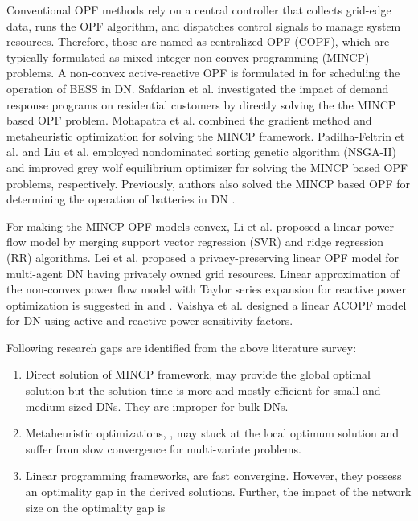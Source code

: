 \documentclass{article}
\begin{document}
Conventional OPF methods rely on a central controller that collects grid-edge data, runs the OPF algorithm, and dispatches control signals to manage system resources. Therefore, those are named as centralized OPF (COPF), which are typically formulated as mixed-integer non-convex programming (MINCP) problems. A non-convex active-reactive OPF is formulated in \cite{Gabash} for scheduling the operation of BESS in DN. Safdarian et al. \cite{Safdarian} investigated the impact of demand response programs on residential customers by directly solving the the MINCP based OPF problem. Mohapatra et al. \cite{Mohapatra} combined the gradient method and metaheuristic optimization for solving the MINCP framework. Padilha-Feltrin et al. \cite{Padilha-Feltrin} and Liu et al. \cite{Liu} employed nondominated sorting genetic algorithm (NSGA-II) and improved grey wolf equilibrium optimizer for solving the MINCP based OPF problems, respectively. Previously, authors also solved the MINCP based OPF for determining the operation of batteries in DN \cite{Jha}.   

For making the MINCP OPF models convex, Li et al. \cite{Li} proposed a linear power flow model by merging support vector regression (SVR) and ridge regression (RR) algorithms. Lei et al. \cite{Lei} proposed a privacy-preserving linear OPF model for multi-agent DN having privately owned grid resources.  Linear approximation of the non-convex power flow model with Taylor series expansion for reactive power optimization is suggested in \cite{spaul} and \cite{Yang}. Vaishya et al. \cite{Vaishya} designed a linear ACOPF model for DN using active and reactive power sensitivity factors.

Following research gaps are identified from the above literature survey:
\begin{enumerate}
    \item Direct solution of MINCP framework, \cite{Gabas, Safdarian, Jha} may provide the global optimal solution but the solution time is more and mostly efficient for small and medium sized DNs. They are improper for bulk DNs.
    \item Metaheuristic optimizations, \cite{Mohapatra, Padilha-Feltrin, Liu}, may stuck at the local optimum solution and suffer from slow convergence for multi-variate problems.
    \item Linear programming frameworks, \cite{Li, Lei, spaul, Yang, Vaishya} are fast converging. However, they possess an optimality gap in the derived solutions. Further, the impact of the network size on the optimality gap is 
\end{enumerate}
  
\end{document}
